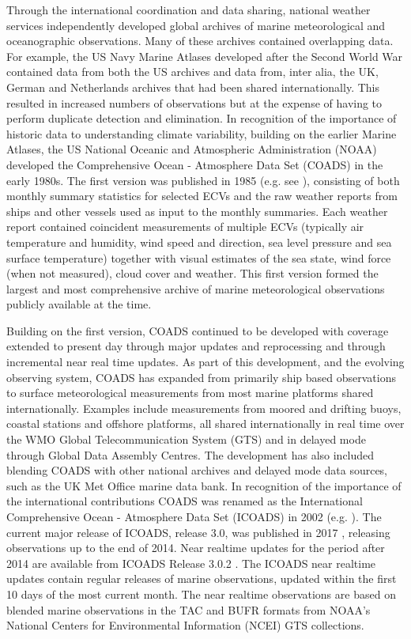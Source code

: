 Through the international coordination and data sharing, national weather services independently developed global archives of marine meteorological and oceanographic observations.
Many of these archives contained overlapping data. 
For example, the US Navy Marine Atlases developed after the Second World War contained data from both the US archives and data from, inter alia, the UK, German and Netherlands archives that had been shared internationally. 
This resulted in increased numbers of observations but at the expense of having to perform duplicate detection and elimination.
In recognition of the importance of historic data to understanding climate variability, building on the earlier Marine Atlases, the US National Oceanic and Atmospheric Administration (NOAA) developed the Comprehensive Ocean - Atmosphere Data Set (COADS) in the early 1980s.
The first version was published in 1985 (e.g. see \cite{Woodruff1987}), consisting of both monthly summary statistics for selected ECVs and the raw weather reports from ships and other vessels used as input to the monthly summaries.
Each weather report contained coincident measurements of multiple ECVs (typically air temperature and humidity, wind speed and direction, sea level pressure and sea surface temperature) together with visual estimates of the sea state, wind force (when not measured), cloud cover and weather. 
This first version formed the largest and most comprehensive archive of marine meteorological observations publicly available at the time. 

Building on the first version, COADS continued to be developed with coverage extended to present day through major updates and reprocessing and through incremental near real time updates. 
As part of this development, and the evolving observing system, COADS has expanded from primarily ship based observations to surface meteorological measurements from most marine platforms shared internationally.
Examples include measurements from moored and drifting buoys, coastal stations and offshore platforms, all shared internationally in real time over the WMO Global Telecommunication System (GTS) and in delayed mode through Global Data Assembly Centres.
The development has also included blending COADS with other national archives and delayed mode data sources, such as the UK Met Office marine data bank.
In recognition of the importance of the international contributions COADS was renamed as the International Comprehensive Ocean - Atmosphere Data Set (ICOADS) in 2002 (e.g. \cite{Worley2005}). 
The current major release of ICOADS, release 3.0, was published in 2017 \cite{Freeman2017}, releasing observations up to the end of 2014.
Near realtime updates for the period after 2014 are available from ICOADS Release 3.0.2 \cite{Liu2022}.
The ICOADS near realtime updates contain regular releases of marine observations, updated within the first 10 days of the most current month. The near realtime observations are based on blended marine observations in the TAC and BUFR formats from NOAA's National Centers for Environmental Information (NCEI) GTS collections. 

